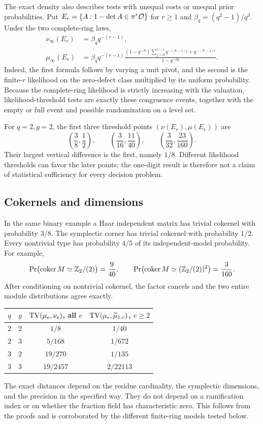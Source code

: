 The exact density also describes tests with unequal costs or unequal
prior probabilities. Put $E_r=\{A:1-\det A\in\pi^r\mathcal O\}$ for $r\ge1$
and $\beta_q=(q^2-1)/q^3$. Under the two complete-ring laws,
\begin{align}
 \nu_\infty(E_r)&=\beta_q q^{-(r-1)},\label{eq:roc-uniform}\\
 \mu_\infty(E_r)&=\beta_q q^{-(r-1)}
 \frac{(1-q^{-N})\sum_{j=0}^{r-1}q^{-(N-1)j}
       +q^{-(N-1)r}}{1-q^{-2g}}.\label{eq:roc-symplectic}
\end{align}
Indeed, the first formula follows by varying a unit pivot, and the
second is the finite-$r$ likelihood on the zero-defect class multiplied
by its uniform probability. Because the complete-ring likelihood is
strictly increasing with the valuation, likelihood-threshold tests
are exactly these congruence events, together with the empty or full
event and possible randomization on a level set.

For $q=2,g=2$, the first three threshold points
$(\nu(E_r),\mu(E_r))$ are
\[
 \left(\frac38,\frac12\right),\qquad
 \left(\frac3{16},\frac{11}{40}\right),\qquad
 \left(\frac3{32},\frac{23}{160}\right).
\]
Their largest vertical difference is the first, namely $1/8$.
Different likelihood thresholds can favor the later points; the
one-digit result is therefore not a claim of statistical sufficiency
for every decision problem.

\subsection{Cokernels and dimensions}

In the same binary example a Haar independent matrix has trivial
cokernel with probability $3/8$. The symplectic corner has trivial
cokernel with probability $1/2$. Every nontrivial type has probability
$4/5$ of its independent-model probability. For example,
\[
 \Pr\bigl(\operatorname{coker} M\simeq\mathbb Z_2/(2)\bigr)=\frac9{40},\qquad
 \Pr\bigl(\operatorname{coker} M\simeq(\mathbb Z_2/(2))^2\bigr)=\frac3{160}.
\]
After conditioning on nontrivial cokernel, the factor cancels and the
two entire module distributions agree exactly.

\begin{center}
\begin{tabular}{@{}cccc@{}}
\toprule
$q$ & $g$ & $\operatorname{TV}(\mu_e,\nu_e)$, all $e$ & $\operatorname{TV}(\mu_e,\widetilde\mu_{1,e})$, $e\ge2$\\
\midrule
$2$ & $2$ & $1/8$ & $1/40$\\
$2$ & $3$ & $5/168$ & $1/672$\\
$3$ & $2$ & $19/270$ & $1/135$\\
$3$ & $3$ & $19/2457$ & $2/22113$\\
\bottomrule
\end{tabular}
\end{center}
The exact distances depend on the residue cardinality, the symplectic
dimensions, and the precision in the specified way. They do not
depend on a ramification index or on whether the fraction field has
characteristic zero. This follows from the proofs and is corroborated
by the different finite-ring models tested below.
